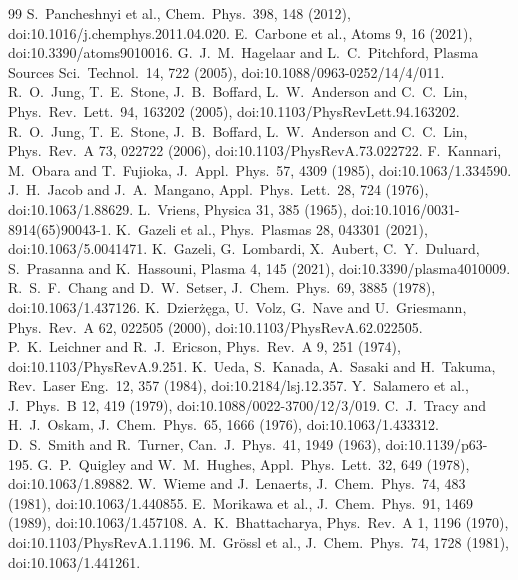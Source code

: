\documentclass[11pt]{article}
\begin{document}
\begin{thebibliography}{99}
\footnotesize
\setlength{\itemsep}{1pt}
 S.~Pancheshnyi et al., Chem.\ Phys.\ 398, 148 (2012), doi:10.1016/j.chemphys.2011.04.020.
 E.~Carbone et al., Atoms 9, 16 (2021), doi:10.3390/atoms9010016.
 G.~J.~M.~Hagelaar and L.~C.~Pitchford, Plasma Sources Sci.\ Technol.\ 14, 722 (2005), doi:10.1088/0963-0252/14/4/011.
 R.~O.~Jung, T.~E.~Stone, J.~B.~Boffard, L.~W.~Anderson and C.~C.~Lin, Phys.\ Rev.\ Lett.\ 94, 163202 (2005), doi:10.1103/PhysRevLett.94.163202.
 R.~O.~Jung, T.~E.~Stone, J.~B.~Boffard, L.~W.~Anderson and C.~C.~Lin, Phys.\ Rev.\ A 73, 022722 (2006), doi:10.1103/PhysRevA.73.022722.
 F.~Kannari, M.~Obara and T.~Fujioka, J.\ Appl.\ Phys.\ 57, 4309 (1985), doi:10.1063/1.334590.
 J.~H.~Jacob and J.~A.~Mangano, Appl.\ Phys.\ Lett.\ 28, 724 (1976), doi:10.1063/1.88629.
 L.~Vriens, Physica 31, 385 (1965), doi:10.1016/0031-8914(65)90043-1.
 K.~Gazeli et al., Phys.\ Plasmas 28, 043301 (2021), doi:10.1063/5.0041471.
 K.~Gazeli, G.~Lombardi, X.~Aubert, C.~Y.~Duluard, S.~Prasanna and K.~Hassouni, Plasma 4, 145 (2021), doi:10.3390/plasma4010009.
 R.~S.~F.~Chang and D.~W.~Setser, J.\ Chem.\ Phys.\ 69, 3885 (1978), doi:10.1063/1.437126.
 K.~Dzier\.z\k{e}ga, U.~Volz, G.~Nave and U.~Griesmann, Phys.\ Rev.\ A 62, 022505 (2000), doi:10.1103/PhysRevA.62.022505.
 P.~K.~Leichner and R.~J.~Ericson, Phys.\ Rev.\ A 9, 251 (1974), doi:10.1103/PhysRevA.9.251.
 K.~Ueda, S.~Kanada, A.~Sasaki and H.~Takuma, Rev.\ Laser Eng.\ 12, 357 (1984), doi:10.2184/lsj.12.357.
 Y.~Salamero et al., J.\ Phys.\ B 12, 419 (1979), doi:10.1088/0022-3700/12/3/019.
 C.~J.~Tracy and H.~J.~Oskam, J.\ Chem.\ Phys.\ 65, 1666 (1976), doi:10.1063/1.433312.
 D.~S.~Smith and R.~Turner, Can.\ J.\ Phys.\ 41, 1949 (1963), doi:10.1139/p63-195.
 G.~P.~Quigley and W.~M.~Hughes, Appl.\ Phys.\ Lett.\ 32, 649 (1978), doi:10.1063/1.89882.
 W.~Wieme and J.~Lenaerts, J.\ Chem.\ Phys.\ 74, 483 (1981), doi:10.1063/1.440855.
 E.~Morikawa et al., J.\ Chem.\ Phys.\ 91, 1469 (1989), doi:10.1063/1.457108.
 A.~K.~Bhattacharya, Phys.\ Rev.\ A 1, 1196 (1970), doi:10.1103/PhysRevA.1.1196.
 M.~Gr\"ossl et al., J.\ Chem.\ Phys.\ 74, 1728 (1981), doi:10.1063/1.441261.

\end{thebibliography}
\end{document}
